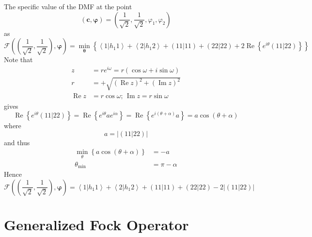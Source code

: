 \documentclass[aps,preprint]{revtex4}%
\begin{document}
The specific value of the DMF at the point
\[
\left(  \mathbf{c,\varphi}\right)  =\left(  \frac{1}{\sqrt{2}},\frac{1}%
{\sqrt{2}},\varphi_{1},\varphi_{2}\right)
\]
as
\[
\mathcal{F}\left(  \left(  \frac{1}{\sqrt{2}},\frac{1}{\sqrt{2}}\right)
,\mathbf{\varphi}\right)  =\min_{\mathbf{\theta}}\left\{  \left\langle
1\left\vert h_{1}1\right.  \right\rangle +\left\langle 2\left\vert
h_{1}2\right.  \right\rangle +\left(  \left.  11\right\vert 11\right)
+\left(  \left.  22\right\vert 22\right)  +2\operatorname{Re}\left\{
e^{i\theta}\left(  \left.  11\right\vert 22\right)  \right\}  \right\}
\]
Note that
\begin{align*}
z  &  =re^{i\omega}=r\left(  \cos\omega+i\sin\omega\right) \\
r  &  =+\sqrt{\left(  \operatorname{Re}z\right)  ^{2}+\left(
\operatorname{Im}z\right)  ^{2}}\\
\operatorname{Re}z  &  =r\cos\omega;\,\operatorname{Im}z=r\sin\omega
\end{align*}
gives
\[
\operatorname{Re}\left\{  e^{i\theta}\left(  \left.  11\right\vert 22\right)
\right\}  =\operatorname{Re}\left\{  e^{i\theta}ae^{i\alpha}\right\}
=\operatorname{Re}\left\{  e^{i\left(  \theta+\alpha\right)  }a\right\}
=a\cos\left(  \theta+\alpha\right)
\]
where
\[
a=\left\vert \left(  \left.  11\right\vert 22\right)  \right\vert
\]
and thus
\begin{align*}
\min_{\theta}\left\{  a\cos\left(  \theta+\alpha\right)  \right\}   &  =-a\\
\theta_{\min}  &  =\pi-\alpha
\end{align*}
Hence
\[
\mathcal{F}\left(  \left(  \frac{1}{\sqrt{2}},\frac{1}{\sqrt{2}}\right)
,\mathbf{\varphi}\right)  =\left\langle 1\left\vert h_{1}1\right.
\right\rangle +\left\langle 2\left\vert h_{1}2\right.  \right\rangle +\left(
\left.  11\right\vert 11\right)  +\left(  \left.  22\right\vert 22\right)
-2\left\vert \left(  \left.  11\right\vert 22\right)  \right\vert
\]


\section{Generalized Fock Operator}
\end{document}
